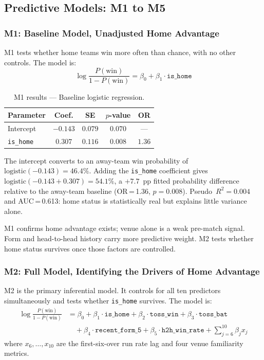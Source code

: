 \documentclass[12pt,a4paper]{article}
\begin{document}
\subsection{Predictive Models: M1 to M5}
\label{sec:models}

\subsubsection{M1: Baseline Model, Unadjusted Home Advantage}

M1 tests whether home teams win more often than chance, with no other controls. The model is:
\[
  \log\frac{P(\text{win})}{1 - P(\text{win})} = \beta_0 + \beta_1 \cdot \texttt{is\_home}
\]

\begin{table}[H]
\centering
\caption{M1 results --- Baseline logistic regression.}
\label{tab:m1}
\begin{tabular}{lcccc}
\toprule
\textbf{Parameter} & \textbf{Coef.} & \textbf{SE} & \textbf{$p$-value} & \textbf{OR} \\
\midrule
Intercept & $-0.143$ & $0.079$ & $0.070$ & --- \\
\texttt{is\_home} & $\mathbf{0.307}$ & $0.116$ & $\mathbf{0.008}$ & $\mathbf{1.36}$ \\
\bottomrule
\end{tabular}
\end{table}

The intercept converts to an away-team win probability of $\text{logistic}(-0.143) = 46.4\%$.
Adding the \texttt{is\_home} coefficient gives $\text{logistic}(-0.143 + 0.307) = 54.1\%$,
a $+7.7$~pp fitted probability difference relative to the away-team baseline (OR\,=\,1.36, $p = 0.008$). Pseudo~$R^2 = 0.004$ and
AUC\,=\,0.613: home status is statistically real but explains little variance alone.

M1 confirms home advantage exists; venue alone is a weak pre-match signal. Form and
head-to-head history carry more predictive weight. M2 tests whether home status survives
once those factors are controlled.

\subsubsection{M2: Full Model, Identifying the Drivers of Home Advantage}

M2 is the primary inferential model. It controls for all ten predictors simultaneously and
tests whether \texttt{is\_home} survives. The model is:
\begin{align*}
  \log\frac{P(\text{win})}{1 - P(\text{win})} &= \beta_0
    + \beta_1 \cdot \texttt{is\_home}
    + \beta_2 \cdot \texttt{toss\_win}
    + \beta_3 \cdot \texttt{toss\_bat} \\
  &\quad + \beta_4 \cdot \texttt{recent\_form\_5}
    + \beta_5 \cdot \texttt{h2h\_win\_rate}
    + \sum_{j=6}^{10} \beta_j x_j
\end{align*}
where $x_6, \ldots, x_{10}$ are the first-six-over run rate lag and four venue familiarity
metrics.
\end{document}
